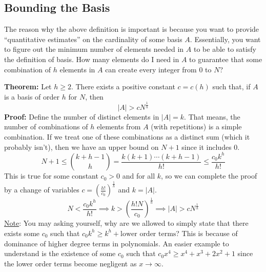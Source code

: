 \documentclass[8pt]{extarticle}
\begin{document}
\subsection{Bounding the Basis}
The reason why the above definition is important is because you want to provide ``quantitative estimates'' on the cardinality of some basis $A$. Essentially, you want to figure out the minimum number of elements needed in $A$ to be able to satisfy the definition of basis. How many elements do I need in $A$ to guarantee that some combination of $h$ elements in $A$ can create every integer from $0$ to $N$? 
\begin{boxedsection}
    \textbf{Theorem:} Let $h \geq 2$. There exists a positive constant $c = c(h)$ such that, if $A$ is a basis of order $h$ for $N$, then
    $$
    |A| > cN^{\frac{1}{h}}
    $$
    \textbf{Proof:} Define the number of distinct elements in $|A| = k$. That means, the number of combinations of $h$ elements from $A$ (with repetitions) is a simple combination. If we treat one of these combinations as a distinct sum (which it probably isn't), then we have an upper bound on $N+1$ since it includes $0$.
    $$
    N+1 \leq {k+h-1 \choose h} = \frac{k(k+1)\cdots(k+h-1)}{h!} \leq \frac{c_0k^h}{h!}
    $$
    This is true for some constant $c_0 > 0$ and for all $k$, so we can complete the proof by a change of variables $c = \left(\frac{h!}{c_0}\right)^{\frac{1}{h}}$ and $k = |A|$. 
    $$
    N < \frac{c_0k^h}{h!} \implies k > \left(\frac{h! N}{c_0}\right)^{\frac{1}{h}} \implies |A| > cN^{\frac{1}{h}}
    $$
    \underline{Note}: You may asking yourself, why are we allowed to simply state that there exists some $c_0$ such that $c_0k^h \geq k^h + \text{lower order terms}$? This is because of dominance of higher degree terms in polynomials. An easier example to understand is the existence of some $c_0$ such that $c_0 x^4 \geq x^4 + x^3 + 2x^2 + 1$ since the lower order terms become negligent as $x \rightarrow \infty$.
\end{boxedsection}
\end{document}
